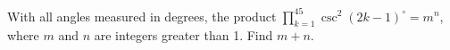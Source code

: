 With all angles measured in degrees, the product $\prod_{k=1}^{45} \csc^2(2k-1)^\circ=m^n$, where $m$ and $n$ are integers greater than 1. Find $m+n$.